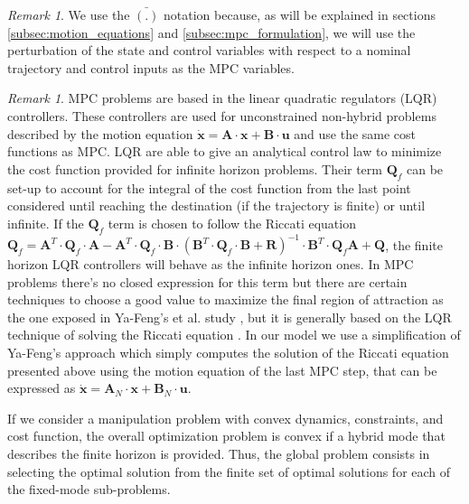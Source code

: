 \documentclass[12,twoside]{TFG-GM}
\theoremstyle{definition}
\theoremstyle{remark}
\newtheorem{remark}[theorem]{Remark}
\newcommand*\diff[1]{\bar{#1}}
\begin{document}
\begin{remark}
We use the $\diff{(.)}$ notation because, as will be explained in sections \ref{subsec:motion_equations} and \ref{subsec:mpc_formulation}, we will use the perturbation of the state and control variables with respect to a nominal trajectory and control inputs as the MPC variables.
\end{remark}
\begin{remark}
MPC problems are based in the linear quadratic regulators (LQR) controllers. These controllers are used for unconstrained non-hybrid problems described by the motion equation $\dot{\textbf{x}} = \textbf{A} \cdot \textbf{x} + \textbf{B} \cdot \textbf{u}$ and use the same cost functions as MPC. LQR are able to give an analytical control law to minimize the cost function provided for infinite horizon problems. Their term $\textbf{Q}_f$ can be set-up to account for the integral of the cost function from the last point considered until reaching the destination (if the trajectory is finite) or until infinite. If the $\textbf{Q}_f$ term is chosen to follow the Riccati equation $\textbf{Q}_f = \textbf{A}^T \cdot \textbf{Q}_f \cdot \textbf{A} - \textbf{A}^T\cdot \textbf{Q}_f\cdot \textbf{B}\cdot(\textbf{B}^T\cdot \textbf{Q}_f \cdot\textbf{B} + \textbf{R})^{-1}\cdot \textbf{B}^T \cdot\textbf{Q}_f \textbf{A} + \textbf{Q}$, the finite horizon LQR controllers will behave as the infinite horizon ones. In MPC problems there's no closed expression for this term but there are certain techniques to choose a good value to maximize the final region of attraction as the one exposed in Ya-Feng's et al. study \cite{riccati}, but it is generally based on the LQR technique of solving the Riccati equation . In our model we use a simplification of Ya-Feng's approach which simply computes the solution of the Riccati equation presented above using the motion equation of the last MPC step, that can be expressed as $\dot{\textbf{x}} = \textbf{A}_N \cdot \textbf{x} + \textbf{B}_N \cdot \textbf{u}$.
\end{remark}

If we consider a manipulation problem with convex dynamics, constraints, and cost function, the overall optimization problem is convex if a hybrid mode that describes the finite horizon is provided. Thus, the global problem consists in selecting the optimal solution from the finite set of optimal solutions for each of the fixed-mode sub-problems.
\end{document}
